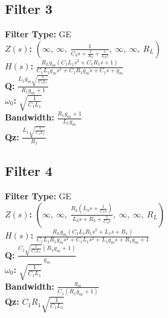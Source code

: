 \documentclass{article}
\begin{document}
\subsection*{Filter 3}
\textbf{Filter Type:} GE \\ 
\textbf{$Z(s)$:} $\left( \infty, \  \infty, \  \frac{1}{C_{3} s + \frac{1}{R_{3}} + \frac{1}{L_{3} s}}, \  \infty, \  \infty, \  R_{L}\right)$ \\ 
\textbf{$H(s)$:} $\frac{R_{L} g_{m} \left(C_{1} L_{1} s^{2} + C_{1} R_{1} s + 1\right)}{C_{1} L_{1} g_{m} s^{2} + C_{1} R_{1} g_{m} s + C_{1} s + g_{m}}$ \\ 
\textbf{Q:} $\frac{L_{1} g_{m} \sqrt{\frac{1}{C_{1} L_{1}}}}{R_{1} g_{m} + 1}$ \\ 
\textbf{$\omega_0$:} $\sqrt{\frac{1}{C_{1} L_{1}}}$ \\ 
\textbf{Bandwidth:} $\frac{R_{1} g_{m} + 1}{L_{1} g_{m}}$ \\ 
\textbf{Qz:} $\frac{L_{1} \sqrt{\frac{1}{C_{1} L_{1}}}}{R_{1}}$ \\ 
\subsection*{Filter 4}
\textbf{Filter Type:} GE \\ 
\textbf{$Z(s)$:} $\left( \infty, \  \infty, \  \frac{R_{3} \left(L_{3} s + \frac{1}{C_{3} s}\right)}{L_{3} s + R_{3} + \frac{1}{C_{3} s}}, \  \infty, \  \infty, \  R_{L}\right)$ \\ 
\textbf{$H(s)$:} $\frac{R_{L} g_{m} \left(C_{1} L_{1} R_{1} s^{2} + L_{1} s + R_{1}\right)}{C_{1} L_{1} R_{1} g_{m} s^{2} + C_{1} L_{1} s^{2} + L_{1} g_{m} s + R_{1} g_{m} + 1}$ \\ 
\textbf{Q:} $\frac{C_{1} \sqrt{\frac{1}{C_{1} L_{1}}} \left(R_{1} g_{m} + 1\right)}{g_{m}}$ \\ 
\textbf{$\omega_0$:} $\sqrt{\frac{1}{C_{1} L_{1}}}$ \\ 
\textbf{Bandwidth:} $\frac{g_{m}}{C_{1} \left(R_{1} g_{m} + 1\right)}$ \\ 
\textbf{Qz:} $C_{1} R_{1} \sqrt{\frac{1}{C_{1} L_{1}}}$ \\ 
\end{document}
